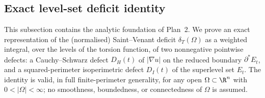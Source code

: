 %
%
%

\subsection{Exact level-set deficit identity}
\label{subsec:plan2-levelset-identity}

This subsection contains the analytic foundation of Plan~2. We prove an
exact representation of the (normalised) Saint--Venant deficit
$\delta_{T}(\Omega)$ as a weighted integral, over the levels of the
torsion function, of two nonnegative pointwise defects: a
Cauchy--Schwarz defect $D_{H}(t)$ of $|\nabla u|$ on the reduced
boundary $\partial^{*}E_{t}$, and a squared-perimeter isoperimetric
defect $D_{I}(t)$ of the superlevel set $E_{t}$. The identity is
valid, in full finite-perimeter generality, for any open
$\Omega\subset\R^{n}$ with $0<|\Omega|<\infty$; no smoothness,
boundedness, or connectedness of $\Omega$ is assumed.

